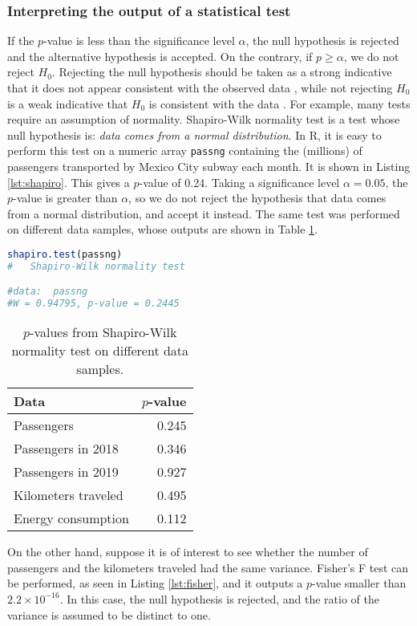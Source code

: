 \documentclass[letterpaper, 10 pt, conference]{article}
\begin{document}
\subsubsection{Interpreting the output of a statistical test}
If the $p$-value is less than the significance level $\alpha$, the null hypothesis is rejected and the alternative hypothesis is accepted. On the contrary, if $p \geq \alpha$, we do not reject $H_0$. Rejecting the null hypothesis should be taken as a strong indicative that it does not appear consistent with the observed data \cite{Ross_2010}, while not rejecting $H_0$ is a weak indicative that $H_0$ is consistent with the data \cite{Ross_2010}.
For example, many tests require an assumption of normality. Shapiro-Wilk normality test is a test whose null hypothesis is: \textit{data comes from a normal distribution}.  In R, it is easy to perform this test on a numeric array \texttt{passng} containing the (millions) of passengers transported by Mexico City subway each month. It is shown in Listing \ref{lst:shapiro}. This gives a $p$-value of 0.24. Taking a significance level $\alpha = 0.05$, the $p$-value is greater than $\alpha$, so we do not reject the hypothesis that data comes from a normal distribution, and accept it instead. The same test was performed on different data samples, whose outputs are shown in Table \ref{tab:shapiro}.
\begin{lstlisting}[language=R, caption={Normality test}, label={lst:shapiro} ]
shapiro.test(passng)
#	Shapiro-Wilk normality test

#data:  passng
#W = 0.94795, p-value = 0.2445
\end{lstlisting}


\begin{table}
	\centering
	\caption{$p$-values from Shapiro-Wilk normality test on different data samples.}
	\begin{tabular}{lr}
		\hline
		Data & $p$-value\\ 
		\hline
		Passengers & 0.245 \\ 
		Passengers in 2018 & 0.346 \\ 
		Passengers in 2019 & 0.927 \\ 
		Kilometers traveled & 0.495 \\ 
		Energy consumption & 0.112 \\ 
		\hline
	\end{tabular}
	\label{tab:shapiro}
\end{table}

On the other hand, suppose it is of interest to see whether the number of passengers and the kilometers traveled had the same variance. Fisher's F test can be performed, as seen in Listing \ref{lst:fisher}, and it outputs a $p$-value smaller than $2.2 \times 10^{-16}$. In this case, the null hypothesis is rejected, and the ratio of the variance is assumed to be distinct to one.
\end{document}
